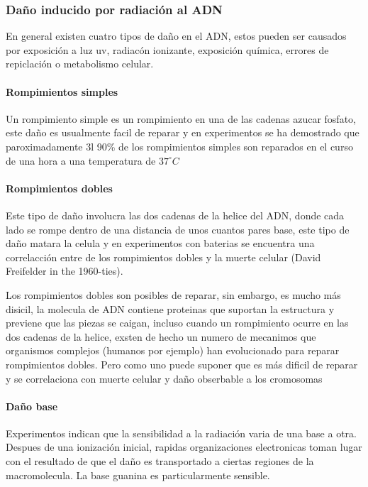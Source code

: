 \subsubsection{Daño inducido por radiación al ADN}
En general existen cuatro tipos de daño en el ADN, estos pueden ser causados por exposición a luz uv, radiacón ionizante, exposición química, errores de repiclación o metabolismo celular.
\paragraph{Rompimientos simples}
Un rompimiento simple es un rompimiento en una de las cadenas azucar fosfato, este daño es usualmente facil de reparar y en experimentos  se ha demostrado que paroximadamente 3l 90\% de los rompimientos simples son reparados en el curso de una hora a una temperatura de $37^{\circ} C$

\paragraph{Rompimientos dobles}

Este tipo de daño involucra las dos cadenas de la helice del ADN, donde cada lado se rompe dentro de una distancia de unos cuantos pares base, este tipo de daño matara la celula y en experimentos con baterias se encuentra una correlacción entre de los rompimientos dobles y la muerte celular (David Freifelder in the 1960-ties).

Los rompimientos dobles son posibles de reparar, sin embargo, es mucho más disicil, la molecula de ADN contiene proteinas que suportan la estructura y previene que las piezas se caigan, incluso cuando un rompimiento ocurre en las dos cadenas de la helice, exsten de hecho un numero de mecanimos que organismos complejos (humanos por ejemplo) han evolucionado para reparar rompimientos dobles. Pero como uno puede suponer que es más dificil de reparar y se correlaciona con muerte celular y daño obserbable a los cromosomas

\paragraph{Daño base}

Experimentos indican que la sensibilidad a la radiación varia de una base a otra. Despues de una ionización inicial, rapidas organizaciones electronicas toman lugar con el resultado de que el daño es transportado a ciertas regiones de la macromolecula. La base guanina es particularmente sensible.

